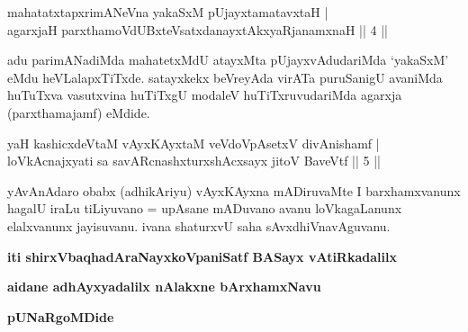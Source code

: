 \begin{shl}
mahatatxtapxrimANeVna yakaSxM pUjayxtamatavxtaH | \\
agarxjaH parxthamoVdUBxteVsatxdanayxtAkxyaRjanamxnaH \hfill ||  4 || 
\end{shl}

\begin{artha}
adu parimANadiMda mahatetxMdU atayxMta pUjayxvAdudariMda `yakaSxM' eMdu heVLalapxTiTxde. satayxkekx beVreyAda virATa puruSanigU avaniMda huTuTxva vasutxvina huTiTxgU modaleV huTiTxruvudariMda agarxja (parxthamajamf) eMdide.
\end{artha}


\begin{shl}
yaH kashicxdeVtaM vAyxKAyxtaM veVdoVpAsetxV divAnishamf | \\
loVkAcnajxyati sa savARcnashxturxshAcxsayx jitoV BaveVtf \hfill ||  5 ||
\end{shl}

\begin{artha}
yAvAnAdaro obabx (adhikAriyu) vAyxKAyxna mADiruvaMte I barxhamxvanunx hagalU iraLu tiLiyuvano = upAsane mADuvano avanu loVkagaLanunx elalxvanunx jayisuvanu. ivana shaturxvU saha sAvxdhiVnavAguvanu.
\end{artha}

\begin{center}
{\bf iti shirxVbaqhadAraNayxkoVpaniSatf BASayx vAtiRkadalilx}
\smallskip

{\bf aidane adhAyxyadalilx nAlakxne bArxhamxNavu}

\smallskip
{\bf pUNaRgoMDide}
\end{center}
